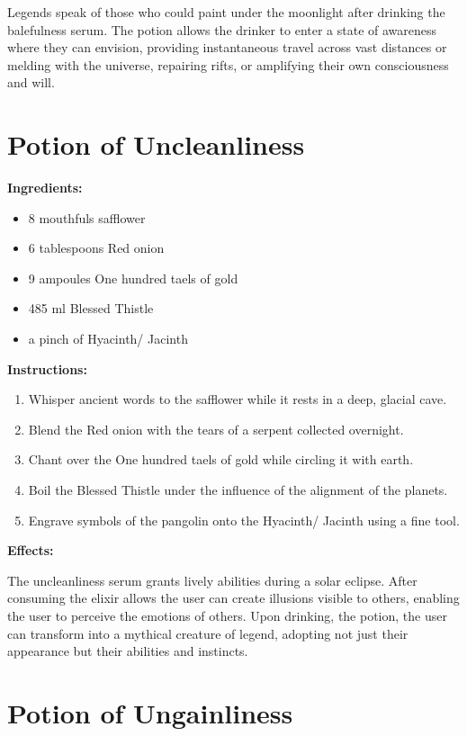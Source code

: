\documentclass{article}
\begin{document}
Legends speak of those who could paint under the moonlight after drinking the balefulness serum. The potion allows the drinker to enter a state of awareness where they can envision, providing instantaneous travel across vast distances or melding with the universe, repairing rifts, or amplifying their own consciousness and will.

\newpage
\section*{Potion of Uncleanliness}

\textbf{Ingredients:}

\begin{itemize}
  \item 8 mouthfuls safflower
  \item 6 tablespoons Red onion
  \item 9 ampoules One hundred taels of gold
  \item 485 ml Blessed Thistle
  \item a pinch of Hyacinth/ Jacinth
\end{itemize}

\textbf{Instructions:}

\begin{enumerate}
  \item Whisper ancient words to the safflower while it rests in a deep, glacial cave.
  \item Blend the Red onion with the tears of a serpent collected overnight.
  \item Chant over the One hundred taels of gold while circling it with earth.
  \item Boil the Blessed Thistle under the influence of the alignment of the planets.
  \item Engrave symbols of the pangolin onto the Hyacinth/ Jacinth using a fine tool.
\end{enumerate}

\textbf{Effects:}

The uncleanliness serum grants lively abilities during a solar eclipse. After consuming the elixir allows the user can create illusions visible to others, enabling the user to perceive the emotions of others. Upon drinking, the potion, the user can transform into a mythical creature of legend, adopting not just their appearance but their abilities and instincts.

\newpage
\section*{Potion of Ungainliness}
\end{document}
